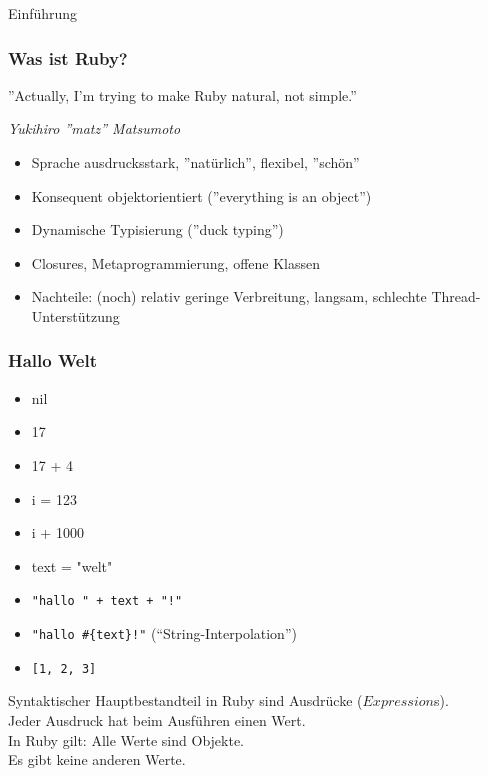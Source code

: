\documentclass{beamer}
\begin{document}
\lstset{language=Ruby}
\lstset{basicstyle=\small,numbers=none, numberstyle=\tiny, numbersep=5pt}


\begin{frame}
\titlepage
\end{frame}

\begin{frame}{Einführung}
\frametitle{Was ist Ruby?}

\begin{center}
''Actually, I'm trying to make Ruby natural, not simple.'' 
\end{center}
\begin{flushright}
\emph{Yukihiro ''matz'' Matsumoto}
\end{flushright}



\begin{itemize}
\pause \item Sprache ausdrucksstark\pause, ''natürlich''\pause, flexibel\pause, ''schön''
\pause \item Konsequent objektorientiert (''everything is an object'')
\pause \item Dynamische Typisierung (''duck typing'')
\pause \item Closures, Metaprogrammierung, offene Klassen
\pause \item Nachteile: (noch) relativ geringe Verbreitung\pause,  langsam\pause, 
              schlechte Thread-Unterstützung
\end{itemize}
\end{frame}

\begin{frame}[fragile]
  \frametitle{Hallo Welt}
  \begin{itemize}[<+->]
  \item nil
  \item 17
  \item 17 + 4
  \item i = 123
  \item i + 1000
  \item text = "welt"
  \item \verb|"hallo " + text + "!"|
  \item \verb|"hallo #{text}!"| \hspace{5em}  (``String-Interpolation'')
  \item \verb|[1, 2, 3]|
  \end{itemize}
  \pause
  Syntaktischer Hauptbestandteil in Ruby sind Ausdrücke ($Expression$s).\\
  Jeder Ausdruck hat beim Ausführen einen Wert. \\
  
  In Ruby gilt: Alle Werte sind Objekte.\\
  Es gibt keine anderen Werte.

\end{frame}
\end{document}
